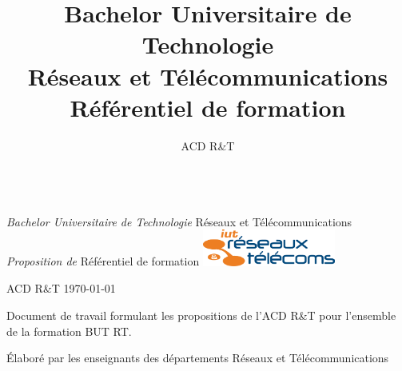 \documentclass[10pt,french]{article} %
\title{Bachelor Universitaire de Technologie\\
Réseaux et Télécommunications\\
Référentiel de formation}
\author{ACD R\&T}%
\begin{document}

\renewcommand{\labelitemi}{$\bullet$}
\renewcommand{\labelitemii}{$\circ$}
\pagestyle{BO}

\thispagestyle{empty}
\begin{center}
~\\
\vskip 3cm
{\huge
{\em Bachelor Universitaire de Technologie}
\vskip 1cm
Réseaux et Télécommunications
}
\vskip 2cm
{\em Proposition de}
\vskip 2mm
{\huge
Référentiel de formation
}
\vskip 2cm
\includegraphics[height=12mm]{img/logo_IUT_R_T_condense}

\vskip 1cm
{\Large
ACD R\&T
}
\vskip 5mm
\today


\vskip 2cm
\begin{boitepagetitre}
Document de travail formulant les propositions de l'ACD R\&T pour l'ensemble de la formation BUT RT.
\medskip

Élaboré par les enseignants des départements Réseaux et Télécommunications
\end{boitepagetitre}

\end{center}

\clearpage

\setcounter{tocdepth}{2} %
\tableofcontents %
	

%
%
\end{document}
